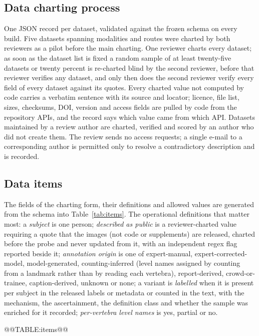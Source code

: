 \documentclass[11pt,a4paper]{article}
\newcommand{\tabref}[1]{Table~\ref{tab:#1}}
\begin{document}
\subsection{Data charting process}\label{sec:charting}
One JSON record per dataset, validated against the frozen schema on every build. Five datasets spanning modalities and routes were charted by both reviewers as a pilot before the main charting. One reviewer charts every dataset; as soon as the dataset list is fixed a random sample of at least twenty-five datasets or twenty percent is re-charted blind by the second reviewer, before that reviewer verifies any dataset, and only then does the second reviewer verify every field of every dataset against its quotes. Every charted value not computed by code carries a verbatim sentence with its source and locator; licence, file list, sizes, checksums, DOI, version and access fields are pulled by code from the repository APIs, and the record says which value came from which API. Datasets maintained by a review author are charted, verified and scored by an author who did not create them. The review sends no access requests; a single e-mail to a corresponding author is permitted only to resolve a contradictory description and is recorded.

\subsection{Data items}\label{sec:items}
The fields of the charting form, their definitions and allowed values are generated from the schema into \tabref{items}. The operational definitions that matter most: a \emph{subject} is one person; \emph{described as public} is a reviewer-charted value requiring a quote that the images (not code or supplements) are released, charted before the probe and never updated from it, with an independent regex flag reported beside it; \emph{annotation origin} is one of expert-manual, expert-corrected-model, model-generated, counting-inferred (level names assigned by counting from a landmark rather than by reading each vertebra), report-derived, crowd-or-trainee, caption-derived, unknown or none; a variant is \emph{labelled} when it is present per subject in the released labels or metadata or counted in the text, with the mechanism, the ascertainment, the definition class and whether the sample was enriched for it recorded; \emph{per-vertebra level names} is yes, partial or no.

@@TABLE:items@@
\end{document}
